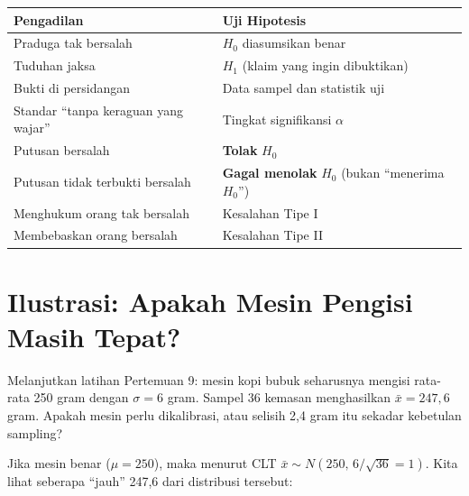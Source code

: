 \documentclass[
  indonesian,
  letterpaper,
]{book}
\newcounter{none} %
\begin{document}
{\def\LTcaptype{none} %
\begin{longtable}[]{@{}
  >{\raggedright\arraybackslash}p{}
  >{\raggedright\arraybackslash}p{}@{}}
\toprule\noalign{}
\begin{minipage}[b]{\linewidth}\raggedright
Pengadilan
\end{minipage} & \begin{minipage}[b]{\linewidth}\raggedright
Uji Hipotesis
\end{minipage} \\
\midrule\noalign{}
\endhead
\bottomrule\noalign{}
\endlastfoot
Praduga tak bersalah & \(H_0\) diasumsikan benar \\
Tuduhan jaksa & \(H_1\) (klaim yang ingin dibuktikan) \\
Bukti di persidangan & Data sampel dan statistik uji \\
Standar ``tanpa keraguan yang wajar'' & Tingkat signifikansi
\(\alpha\) \\
Putusan bersalah & \textbf{Tolak} \(H_0\) \\
Putusan tidak terbukti bersalah & \textbf{Gagal menolak} \(H_0\) (bukan
``menerima \(H_0\)'') \\
Menghukum orang tak bersalah & Kesalahan Tipe I \\
Membebaskan orang bersalah & Kesalahan Tipe II \\
\end{longtable}
}

\section{Ilustrasi: Apakah Mesin Pengisi Masih
Tepat?}\label{ilustrasi-apakah-mesin-pengisi-masih-tepat}

Melanjutkan latihan Pertemuan 9: mesin kopi bubuk seharusnya mengisi
rata-rata 250 gram dengan \(\sigma = 6\) gram. Sampel 36 kemasan
menghasilkan \(\bar{x} = 247{,}6\) gram. Apakah mesin perlu dikalibrasi,
atau selisih 2,4 gram itu sekadar kebetulan sampling?

Jika mesin benar (\(\mu = 250\)), maka menurut CLT
\(\bar{x} \sim N(250,\, 6/\sqrt{36} = 1)\). Kita lihat seberapa ``jauh''
247,6 dari distribusi tersebut:
\end{document}
